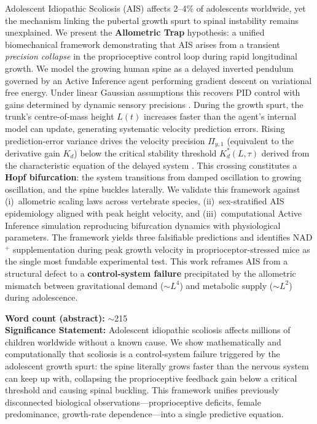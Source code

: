 \documentclass[12pt, letterpaper]{article}
\newcommand{\Kd}{K_d}
\newcommand{\Kdcrit}{K_d^{*}}
\newcommand{\Piy}{\Pi_{y,1}}
\begin{document}
Adolescent Idiopathic Scoliosis (AIS) affects 2--4\% of adolescents worldwide, yet
the mechanism linking the pubertal growth spurt to spinal instability remains
unexplained. We present the \textbf{Allometric Trap} hypothesis: a unified
biomechanical framework demonstrating that AIS arises from a transient
\emph{precision collapse} in the proprioceptive control loop during rapid
longitudinal growth. We model the growing human spine as a delayed inverted
pendulum governed by an Active Inference agent performing gradient descent on
variational free energy. Under linear Gaussian assumptions this recovers PID
control with gains determined by dynamic sensory precisions \citep{Baltieri2019}.
During the growth spurt, the trunk's centre-of-mass height $L(t)$ increases
faster than the agent's internal model can update, generating systematic velocity
prediction errors. Rising prediction-error variance drives the velocity precision
$\Piy$ (equivalent to the derivative gain $\Kd$) below the critical stability
threshold $\Kdcrit(L, \tau)$ derived from the characteristic equation of the
delayed system \citep{Insperger2011}. This crossing constitutes a \textbf{Hopf
bifurcation}: the system transitions from damped oscillation to growing
oscillation, and the spine buckles laterally. We validate this framework against
(i)~allometric scaling laws across vertebrate species, (ii)~sex-stratified AIS
epidemiology aligned with peak height velocity, and (iii)~computational Active
Inference simulation reproducing bifurcation dynamics with physiological
parameters. The framework yields three falsifiable predictions and identifies
NAD$^{+}$ supplementation during peak growth velocity in proprioceptor-stressed
mice as the single most fundable experimental test. This work reframes AIS from a
structural defect to a \textbf{control-system failure} precipitated by the
allometric mismatch between gravitational demand ($\sim L^{4}$) and metabolic
supply ($\sim L^{2}$) during adolescence.

\textbf{Word count (abstract):} $\sim$215\\[0.5em]

\noindent\textbf{Significance Statement:} Adolescent idiopathic scoliosis affects
millions of children worldwide without a known cause. We show mathematically and
computationally that scoliosis is a control-system failure triggered by the
adolescent growth spurt: the spine literally grows faster than the nervous system
can keep up with, collapsing the proprioceptive feedback gain below a critical
threshold and causing spinal buckling. This framework unifies previously
disconnected biological observations---proprioceptive deficits, female
predominance, growth-rate dependence---into a single predictive equation.
\end{document}
